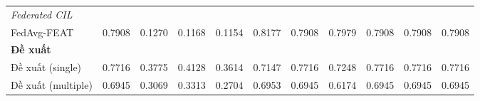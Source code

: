 \begin{table}[H]
{\begin{tabular}{lcccccccccc}
        \hline
        \multicolumn{11}{l}{\textit{Federated CIL}} \\
        FedAvg-FEAT & \cellcolor{green!60!black}0.7908 & 0.1270 & 0.1168 & 0.1154 & \cellcolor{green!60!black}0.8177 & \cellcolor{green!60!black}0.7908 & \cellcolor{green!60!black}0.7979 & \cellcolor{green!60!black}0.7908 & \cellcolor{green!60!black}0.7908 & \cellcolor{green!60!black}0.7908 \\
        \hline
        \multicolumn{11}{l}{\textbf{Đề xuất}} \\
        Đề xuất (single) & \cellcolor{green!30}0.7716 & \cellcolor{green!60!black}0.3775 & \cellcolor{green!60!black}0.4128 & \cellcolor{green!60!black}0.3614 & \cellcolor{green!90!black}0.7147 & \cellcolor{green!30}0.7716 & \cellcolor{green!90!black}0.7248 & \cellcolor{green!30}0.7716 & \cellcolor{green!30}0.7716 & \cellcolor{green!30}0.7716 \\
        Đề xuất (multiple) & 0.6945 & \cellcolor{green!90!black}0.3069 & 0.3313 & \cellcolor{green!30}0.2704 & \cellcolor{green!30}0.6953 & 0.6945 & 0.6174 & 0.6945 & 0.6945 & 0.6945 \\
        \hline
    \end{tabular}}
\end{table}

